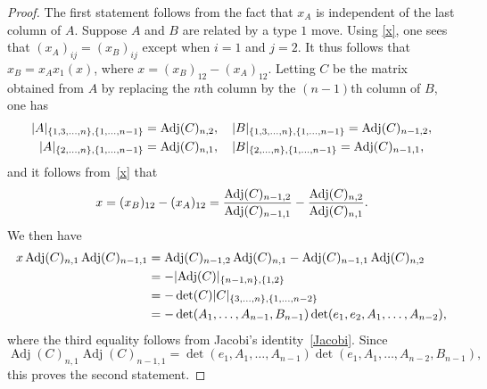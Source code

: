 \documentclass[11pt]{amsart}
\theoremstyle{definition}
\numberwithin{equation}{section}
\def\printname#1{
        \if\draft y
                \smash{\makebox[0pt]{\hspace{-0.5in}
                        \raisebox{8pt}{\tt\tiny #1}}}
        \fi
}
\def\lbl#1{\label{#1}\printname{#1}}
\DeclareMathOperator{\Adj}{Adj}
\DeclarePairedDelimiter{\Norm}{\lvert}{\rvert}
\begin{document}
\begin{proof}
The first statement follows from the fact that $x_A$ is independent of the last column of $A$.
Suppose $A$ and $B$ are related by a type $1$ move. Using \eqref{x}, one sees that $(x_A)_{ij}=(x_B)_{ij}$ except when $i=1$ and $j=2$. It thus follows that $x_B=x_Ax_1(x)$, where $x=(x_B)_{12}-(x_A)_{12}$. Letting $C$ be the matrix obtained from $A$ by replacing the $n$th column by the $(n-1)$th column of $B$, one has 
\begin{equation*}
\begin{gathered}
\Norm{A}_{\{1,3,\dots,n\},\{1,\dots,n-1\}}=\Adj(C)_{n,2},\quad \Norm{B}_{\{1,3,\dots,n\},\{1,\dots,n-1\}}=\Adj(C)_{n-1,2},\\
\Norm{A}_{\{2,\dots,n\},\{1,\dots,n-1\}}=\Adj(C)_{n,1},\quad \Norm{B}_{\{2,\dots,n\},\{1,\dots,n-1\}}=\Adj(C)_{n-1,1},
\end{gathered}
\end{equation*}
and it follows from~\eqref{x} that 
\begin{equation}\lbl{type1eq} x=(x_B)_{12}-(x_A)_{12}=\frac{\Adj(C)_{n-1,2}}{\Adj(C)_{n-1,1}}-\frac{\Adj(C)_{n,2}}{\Adj(C)_{n,1}}.
\end{equation}
We then have
\begin{align*}
x\Adj(C)_{n,1}\Adj(C)_{n-1,1}&=\Adj(C)_{n-1,2}\Adj(C)_{n,1}-\Adj(C)_{n-1,1}\Adj(C)_{n,2}\\&=-\Norm{\Adj(C)}_{\{n-1,n\},\{1,2\}}\\&=
-\det(C)\Norm{C}_{\{3,\dots,n\},\{1,\dots,n-2\}}\\&=-\det(A_1,\dots,A_{n-1},B_{n-1})\det(e_1,e_2,A_1,\dots,A_{n-2}),
\end{align*}
where the third equality follows from Jacobi's identity~\eqref{Jacobi}.
Since \begin{equation*}\Adj(C)_{n,1}\Adj(C)_{n-1,1}=\det(e_1,A_1,\dots,A_{n-1})\det(e_1,A_1,\dots,A_{n-2},B_{n-1}),\end{equation*} this proves the second statement. 


\end{proof}
\end{document}
